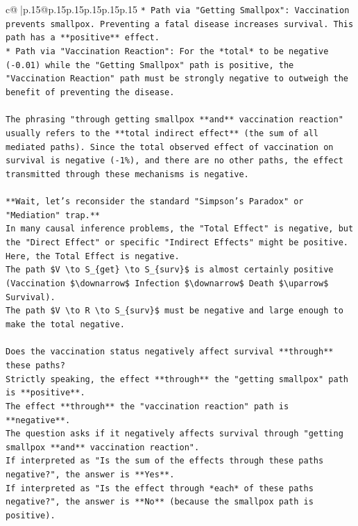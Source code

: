 \documentclass{article}
\begin{document}
{\begin{supertabular}{c@{$\;$}|p{.15\linewidth}@{}p{.15\linewidth}p{.15\linewidth}p{.15\linewidth}p{.15\linewidth}p{.15\linewidth}}
{{{\texttt{*   Path via "Getting Smallpox": Vaccination prevents smallpox. Preventing a fatal disease increases survival. This path has a **positive** effect.} \\
\texttt{*   Path via "Vaccination Reaction": For the *total* to be negative ({-}0.01) while the "Getting Smallpox" path is positive, the "Vaccination Reaction" path must be strongly negative to outweigh the benefit of preventing the disease.} \\
\\ 
\texttt{The phrasing "through getting smallpox **and** vaccination reaction" usually refers to the **total indirect effect** (the sum of all mediated paths). Since the total observed effect of vaccination on survival is negative ({-}1\%), and there are no other paths, the effect transmitted through these mechanisms is negative.} \\
\\ 
\texttt{**Wait, let's reconsider the standard "Simpson's Paradox" or "Mediation" trap.**} \\
\texttt{In many causal inference problems, the "Total Effect" is negative, but the "Direct Effect" or specific "Indirect Effects" might be positive.} \\
\texttt{Here, the Total Effect is negative.} \\
\texttt{The path \$V \textbackslash{}to S\_\{get\} \textbackslash{}to S\_\{surv\}\$ is almost certainly positive (Vaccination \$\textbackslash{}downarrow\$ Infection \$\textbackslash{}downarrow\$ Death \$\textbackslash{}uparrow\$ Survival).} \\
\texttt{The path \$V \textbackslash{}to R \textbackslash{}to S\_\{surv\}\$ must be negative and large enough to make the total negative.} \\
\\ 
\texttt{Does the vaccination status negatively affect survival **through** these paths?} \\
\texttt{Strictly speaking, the effect **through** the "getting smallpox" path is **positive**.} \\
\texttt{The effect **through** the "vaccination reaction" path is **negative**.} \\
\texttt{The question asks if it negatively affects survival through "getting smallpox **and** vaccination reaction".} \\
\texttt{If interpreted as "Is the sum of the effects through these paths negative?", the answer is **Yes**.} \\
\texttt{If interpreted as "Is the effect through *each* of these paths negative?", the answer is **No** (because the smallpox path is positive).} \\
}}}
\end{supertabular}}
\end{document}
